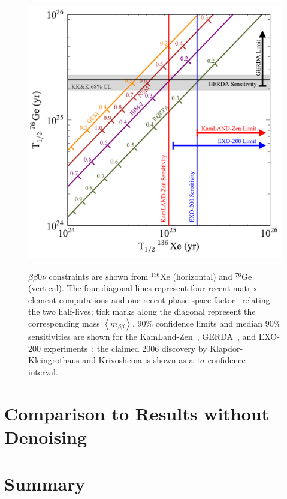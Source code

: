 \begin{figure}
\begin{center}
\includegraphics[keepaspectratio=true,width=\textwidth]{MatplotLibSensitivity.pdf}
\end{center}
\renewcommand{\baselinestretch}{1}
\small\normalsize
\begin{quote}
\caption{$\beta\beta 0\nu$ constraints are shown from $^{136}$Xe (horizontal) and $^{76}$Ge (vertical).  The four diagonal lines represent four recent matrix element computations \cite{PhysRevLett.105.252503,Menéndez2009139,PhysRevC.87.014315,PhysRevC.87.045501} and one recent phase-space factor~\cite{PhysRevC.85.034316} relating the two half-lives; tick marks along the diagonal represent the corresponding mass $\left<m_{\beta\beta}\right>$.  $90\%$ confidence limits and median $90\%$ sensitivities are shown for the KamLand-Zen~\cite{PhysRevLett.110.062502}, GERDA~\cite{PhysRevLett.111.122503}, and EXO-200 experiments~\cite{NewEXObb0nPaper_2014}; the claimed 2006 discovery by Klapdor-Kleingrothaus and Krivosheina is shown as a $1\sigma$ confidence interval.~\cite{Klapdor}}
\label{fig:MatplotlibSensitivity}
\end{quote}
\end{figure}
\renewcommand{\baselinestretch}{2}
\small\normalsize



\section{Comparison to Results without Denoising}\label{sec:ResultComparison}

\section{Summary}\label{sec:ResultSummary}

